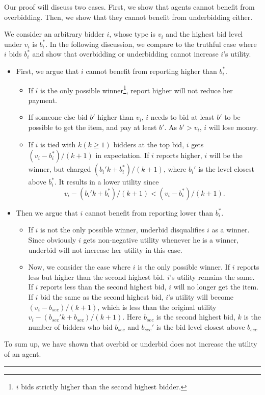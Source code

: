 \documentclass[letterpaper]{article}
\newenvironment{proof}{{Proof:}}{\hfill\rule{2mm}{2mm}}
\begin{document}
\begin{proof}

	Our proof will discuss two cases.
	First, we show that agents cannot benefit from overbidding.
	Then, we show that they cannot benefit from underbidding either.
	
	We consider an arbitrary bidder $i$, whose type is $v_i$ and the highest bid level under $v_i$ is $b_i^*$.
	In the following discussion, we compare to the truthful case where $i$ bids $b_i^*$ and show that overbidding or underbidding cannot increase $i$'s utility.
	\begin{itemize}
		\item First, we argue that $i$ cannot benefit from reporting higher than $b_i^*$.
		\begin{itemize}
			\item If $i$ is the only possible winner\footnote{$i$ bids strictly higher than the second highest bidder.}, report higher will not reduce her payment.
			\item If someone else bid $b'$ higher than $v_i$, $i$ needs to bid at least $b'$ to be possible to get the item, and pay at least $b'$. As $b'>v_i$, $i$ will lose money.
			\item If $i$ is tied with $k(k\geq 1)$ bidders at the top bid, $i$ gets $(v_i-b_i^*)/(k+1)$ in expectation. If $i$ reports higher, $i$ will be the winner, but charged $(b_i' k+b_i^*)/(k+1)$, where $b_i'$ is the level closest above $b_i^*$. It results in a lower utility since $$v_i-(b_i' k+b_i^*)/(k+1)<(v_i-b_i^*)/(k+1).$$
		\end{itemize}
		\item Then we argue that $i$ cannot benefit from reporting lower than $b_i^*$.
		\begin{itemize}
			\item If $i$ is not the only possible winner, underbid disqualifies $i$ as a winner. Since obviously $i$ gets non-negative utility whenever he is a winner, underbid will not increase her utility in this case.
			\item Now, we consider the case where $i$ is the only possible winner. If $i$ reports less but higher than  the second highest bid. $i$'s utility remains the same. If $i$ reports less than the second highest bid, $i$ will no longer get the item. If $i$ bid the same as the second highest bid, $i$'s utility will become  $(v_i-b_{sec})/(k+1)$, which is less than the original utility $v_i-(b_{sec}' k+b_{sec})/(k+1)$. Here $b_{sec}$ is the second highest bid, $k$ is the number of bidders who bid $b_{sec}$ and $b_{sec}'$ is the bid level closest above $b_{sec}$
		\end{itemize}
	\end{itemize}
	
	To sum up, we have shown that overbid or underbid does not increase the utility of an agent.
\end{proof}
\end{document}
